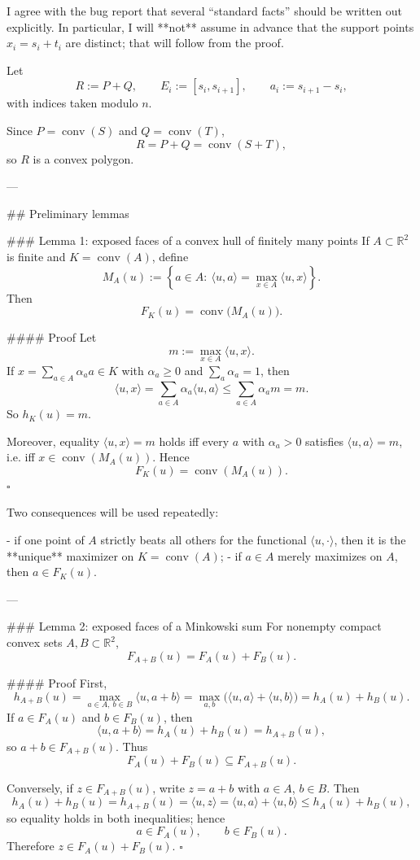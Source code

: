 I agree with the bug report that several “standard facts” should be written out explicitly.  
In particular, I will **not** assume in advance that the support points \(x_i=s_i+t_i\) are distinct; that will follow from the proof.

Let
\[
R:=P+Q,\qquad E_i:=[s_i,s_{i+1}],\qquad a_i:=s_{i+1}-s_i,
\]
with indices taken modulo \(n\).

Since \(P=\operatorname{conv}(S)\) and \(Q=\operatorname{conv}(T)\),
\[
R=P+Q=\operatorname{conv}(S+T),
\]
so \(R\) is a convex polygon.

---

## Preliminary lemmas

### Lemma 1: exposed faces of a convex hull of finitely many points
If \(A\subset \mathbb{R}^2\) is finite and \(K=\operatorname{conv}(A)\), define
\[
M_A(u):=\left\{a\in A:\ \langle u,a\rangle=\max_{x\in A}\langle u,x\rangle\right\}.
\]
Then
\[
F_K(u)=\operatorname{conv}\bigl(M_A(u)\bigr).
\]

#### Proof
Let
\[
m:=\max_{x\in A}\langle u,x\rangle.
\]
If \(x=\sum_{a\in A}\alpha_a a\in K\) with \(\alpha_a\ge 0\) and \(\sum_a\alpha_a=1\), then
\[
\langle u,x\rangle=\sum_{a\in A}\alpha_a\langle u,a\rangle\le \sum_{a\in A}\alpha_a m=m.
\]
So \(h_K(u)=m\).

Moreover, equality \(\langle u,x\rangle=m\) holds iff every \(a\) with \(\alpha_a>0\) satisfies \(\langle u,a\rangle=m\), i.e. iff \(x\in \operatorname{conv}(M_A(u))\). Hence
\[
F_K(u)=\operatorname{conv}(M_A(u)).
\]
\(\square\)

Two consequences will be used repeatedly:

- if one point of \(A\) strictly beats all others for the functional \(\langle u,\cdot\rangle\), then it is the **unique** maximizer on \(K=\operatorname{conv}(A)\);
- if \(a\in A\) merely maximizes on \(A\), then \(a\in F_K(u)\).

---

### Lemma 2: exposed faces of a Minkowski sum
For nonempty compact convex sets \(A,B\subset \mathbb{R}^2\),
\[
F_{A+B}(u)=F_A(u)+F_B(u).
\]

#### Proof
First,
\[
h_{A+B}(u)=\max_{a\in A,\ b\in B}\langle u,a+b\rangle
=\max_{a,b}\bigl(\langle u,a\rangle+\langle u,b\rangle\bigr)
=h_A(u)+h_B(u).
\]
If \(a\in F_A(u)\) and \(b\in F_B(u)\), then
\[
\langle u,a+b\rangle=h_A(u)+h_B(u)=h_{A+B}(u),
\]
so \(a+b\in F_{A+B}(u)\). Thus
\[
F_A(u)+F_B(u)\subseteq F_{A+B}(u).
\]

Conversely, if \(z\in F_{A+B}(u)\), write \(z=a+b\) with \(a\in A\), \(b\in B\). Then
\[
h_A(u)+h_B(u)=h_{A+B}(u)=\langle u,z\rangle
=\langle u,a\rangle+\langle u,b\rangle\le h_A(u)+h_B(u),
\]
so equality holds in both inequalities; hence
\[
a\in F_A(u),\qquad b\in F_B(u).
\]
Therefore \(z\in F_A(u)+F_B(u)\). \(\square\)

